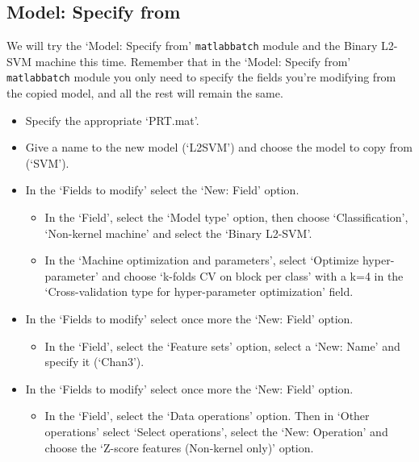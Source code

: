 
\subsection{Model: Specify from}

We will try the `Model: Specify from' {\tt matlabbatch} module and the Binary L2-SVM machine this time. Remember that in the `Model: Specify from' {\tt matlabbatch} module you only need to specify the fields you're modifying from the copied model, and all the rest will remain the same.

\begin{itemize}

\item Specify the appropriate `PRT.mat'.

\item Give a name to the new model (`L2SVM') and choose the model to copy from (`SVM').

\item In the `Fields to modify' select the `New: Field' option.

\begin{itemize}
\item In the `Field', select the `Model type' option, then choose `Classification', `Non-kernel machine' and select the `Binary L2-SVM'.

\item In the `Machine optimization and parameters', select `Optimize hyper-parameter' and choose `k-folds CV on block per class' with a k=4 in the `Cross-validation type for hyper-parameter optimization' field.
\end{itemize}

\item In the `Fields to modify' select once more the `New: Field' option.

\begin{itemize}
\item In the `Field', select the `Feature sets' option, select a `New: Name' and specify it (`Chan3').
\end{itemize}

\item In the `Fields to modify' select once more the `New: Field' option.

\begin{itemize}
\item In the `Field', select the `Data operations' option. Then in `Other operations' select `Select operations', select the `New: Operation' and choose the `Z-score features (Non-kernel only)' option.
\end{itemize}

\end{itemize}

